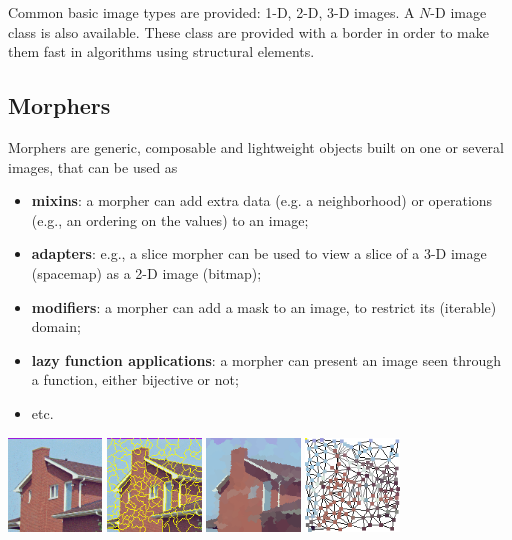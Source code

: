 \documentclass{article}
\begin{document}
Common basic image types are provided: 1-D, 2-D, 3-D images.
A $N$-D image class is also available.
These class are provided with a border in order to make them fast in algorithms
using structural elements.

\subsection{Morphers}

Morphers are generic, composable and lightweight objects built on one or several
images, that can be used as
\begin{itemize}
  \item \textbf{mixins}: a morpher can add extra data (e.g. a neighborhood) or
	operations (e.g., an ordering on the values) to an image;
  \item \textbf{adapters}: e.g., a slice morpher can be used to view a slice of
	a 3-D image (spacemap) as a 2-D image (bitmap);
  \item \textbf{modifiers}: a morpher can add a mask to an image, to restrict its
	(iterable) domain;
  \item \textbf{lazy function applications}: a morpher can present an image seen
        through a function, either bijective or not;
  \item etc.
\end{itemize}

\begin{center}
  \includegraphics[width=2.5cm]{figures/house}%
  \includegraphics[width=2.5cm]{figures/house_wshed}%
  \includegraphics[width=2.5cm]{figures/house_wshed_mean_colors}%
  \includegraphics[width=2.5cm]{figures/house_rag}%
\end{center}
\end{document}
